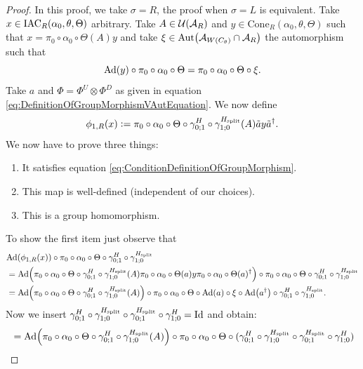 \documentclass[11pt,a4paper,twoside]{article}
\numberwithin{equation}{section}
\begin{document}
	\begin{proof}
		In this proof, we take $\sigma=R$, the proof when $\sigma=L$ is equivalent. Take $x\in \textrm{IAC}_R(\alpha_0,\theta,\Theta)$ arbitrary. Take $A\in\mathcal U(\mathcal A_R)$ and $y\in\textrm{Cone}_R(\alpha_0,\theta,\Theta)$ such that $x=\pi_0\circ\alpha_0\circ\Theta(A)y$ and take $\xi\in\Aut{\AA_{W(C_\theta)}\cap \AA_R}$ the automorphism such that
		\begin{equation}
			\Ad{y}\circ\pi_0\circ\alpha_0\circ\Theta=\pi_0\circ\alpha_0\circ\Theta\circ\xi.
		\end{equation}
		Take $a$ and $\Phi=\Phi^U\otimes\Phi^D$ as given in equation \eqref{eq:DefinitionOfGroupMorphismVAutEquation}. We now define
		\begin{equation}
			\phi_{1,R}(x)\vcentcolon= \pi_0\circ\alpha_0\circ\Theta\circ\gamma^H_{0;1}\circ\gamma^{{H_{\text{split}}}}_{1;0}(A)\tilde{a}y\tilde{a}^\dagger.
		\end{equation}
		We now have to prove three things:
		\begin{enumerate}
			\item It satisfies equation \eqref{eq:ConditionDefinitionOfGroupMorphism}.
			\item This map is well-defined (independent of our choices).
			\item This is a group homomorphism.
		\end{enumerate}
		To show the first item just observe that
		\begin{align}
			&\Ad{\phi_{1,R}(x)}\circ\pi_0\circ\alpha_0\circ\Theta\circ\gamma^H_{0;1}\circ\gamma^{\Hsplit}_{1;0}\\
			&=\Ad{\pi_0\circ\alpha_0\circ\Theta\circ\gamma^H_{0;1}\circ\gamma^{\Hsplit}_{1;0}(A)\pi_0\circ\alpha_0\circ\Theta(a)y\pi_0\circ\alpha_0\circ\Theta(a)^\dagger}\circ\pi_0\circ\alpha_0\circ\Theta\circ\gamma^H_{0;1}\circ\gamma^{\Hsplit}_{1;0}\\
			&=\Ad{\pi_0\circ\alpha_0\circ\Theta\circ\gamma^H_{0;1}\circ\gamma^{\Hsplit}_{1;0}(A)}\circ\pi_0\circ\alpha_0\circ\Theta\circ\Ad{a}\circ\xi\circ\Ad{a^\dagger}\circ\gamma^H_{0;1}\circ\gamma^{\Hsplit}_{1;0}.
		\end{align}
		Now we insert $\gamma^H_{0;1}\circ\gamma^{{H_{\text{split}}}}_{1;0}\circ\gamma^{{H_{\text{split}}}}_{0;1}\circ\gamma^H_{1;0}=\text{Id}$ and obtain:
		\begin{align}
			&=\Ad{\pi_0\circ\alpha_0\circ\Theta\circ\gamma^H_{0;1}\circ\gamma^{\Hsplit}_{1;0}(A)}\circ\pi_0\circ\alpha_0\circ\Theta\circ(\gamma^H_{0;1}\circ\gamma^{\Hsplit}_{1;0}\circ\gamma^{\Hsplit}_{0;1}\circ\gamma^H_{1;0})\\

\end{align}
\end{proof}
\end{document}
